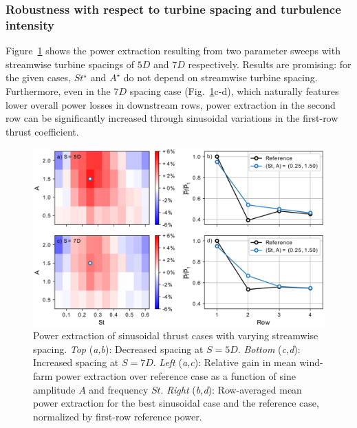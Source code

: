 \documentclass[wes, manuscript]{copernicus}
\begin{document}
\subsubsection{Robustness with respect to turbine spacing and turbulence intensity}

Figure~\ref{fig:sinus_spacing} shows the power extraction resulting from two parameter sweeps with streamwise turbine spacings of $5D$ and $7D$ respectively. Results are promising: for the given cases, $St^\star$ and $A^\star$  do not depend on streamwise turbine spacing. Furthermore, even in the $7D$ spacing case (Fig.~\ref{fig:sinus_spacing}c-d), which naturally features lower overall power losses in downstream rows, power extraction in the second row can be significantly increased through sinusoidal variations in the first-row thrust coefficient. 
\begin{figure}
	\centering
	\includegraphics[width=\textwidth]{figure17}
	\caption{Power extraction of sinusoidal thrust cases with varying streamwise spacing. \emph{Top} (\emph{a,b}): Decreased spacing at $S = 5D$. \emph{Bottom} (\emph{c,d}): Increased spacing at $S = 7D$.  \emph{Left} (\emph{a,c}): Relative gain in mean wind-farm power extraction over reference case as a function of sine amplitude $A$ and frequency $St$. \emph{Right} (\emph{b,d}): Row-averaged mean power extraction for the best sinusoidal case and the reference case, normalized by first-row reference power. \label{fig:sinus_spacing} }
\end{figure}
\end{document}
